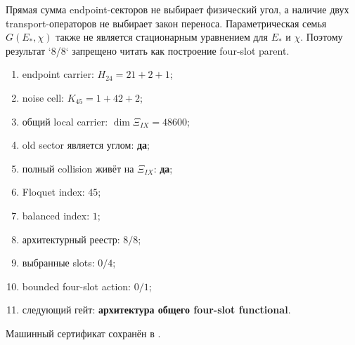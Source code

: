 \begin{nogocriterion}
Прямая сумма endpoint-секторов не выбирает физический угол, а наличие двух
transport-операторов не выбирает закон переноса. Параметрическая семья
$G(E_*,\chi)$ также не является стационарным уравнением для $E_*$ и $\chi$.
Поэтому результат `8/8` запрещено читать как построение four-slot parent.
\end{nogocriterion}

\begin{protocol}\begin{enumerate}
\item endpoint carrier: \textbf{$H_{24}=21+2+1$};
\item noise cell: \textbf{$K_{45}=1+42+2$};
\item общий local carrier: \textbf{$\dim\Xi_{IX}=48600$};
\item old sector является углом: \textbf{да};
\item полный collision живёт на $\Xi_{IX}$: \textbf{да};
\item Floquet index: \textbf{$45$};
\item balanced index: \textbf{$1$};
\item архитектурный реестр: \textbf{$8/8$};
\item выбранные slots: \textbf{$0/4$};
\item bounded four-slot action: \textbf{$0/1$};
\item следующий гейт: \textbf{архитектура общего four-slot functional}.
\end{enumerate}\end{protocol}

Машинный сертификат сохранён в
.